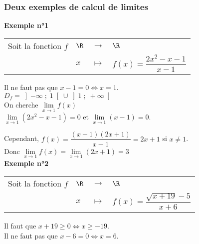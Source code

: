 \vspace*{-1.5cm}

\subsubsection{Deux exemples de calcul de limites}

\textbf{Exemple n°1}

\begin{tabular}{llll}
Soit la fonction $f$ & $\R$ & $\longrightarrow$ & $\R$ \\
& $x$ & $\longmapsto$ & $f(x) = \dfrac{2x^2 -x - 1}{x-1}$ \\
\end{tabular}

\vspace*{.3cm}

Il ne faut pas que $x-1 = 0 \Longleftrightarrow x = 1$. \\

$D_f = \left]-\infty \; ; \; 1 \right[\cup\left]1 \; ; \; +\infty\right[$ \\

On cherche $\lim\limits_{x \to 1} f(x)$ \\

$\lim\limits_{x \to 1} (2x^2 -x - 1) = 0$ et $\lim\limits_{x \to 1} (x-1) = 0$. \\

\vspace*{.3cm}

Cependant, $f(x) = \dfrac{(x-1)(2x+1)}{x-1} = 2x+1$ si $x \neq 1$. \\

Donc $\lim\limits_{x \to 1} f(x) = \lim\limits_{x \to 1} (2x  + 1) = 3$ \\

\textbf{Exemple n°2}

\begin{tabular}{llll}
Soit la fonction $f$ & $\R$ & $\longrightarrow$ & $\R$ \\
& $x$ & $\longmapsto$ & $f(x) = \dfrac{\sqrt{x+19} - 5}{x+6}$ \\
\end{tabular}

\vspace*{.3cm}

Il faut que $x + 19 \geqslant 0 \Longleftrightarrow x \geqslant -19$. \\
Il ne faut pas que $x - 6 = 0 \Longleftrightarrow x = 6$. \\

